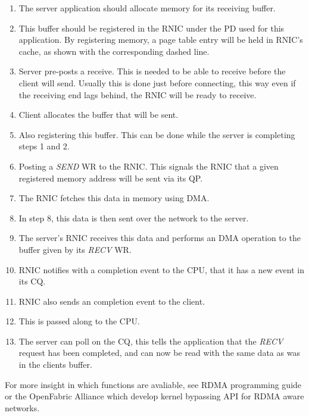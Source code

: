\begin{enumerate}
    \item The server application should allocate memory for its receiving buffer.
    \item This buffer should be registered in the RNIC under the PD used for this application.
    By registering memory, a page table entry will be held in RNIC's cache, as shown with the corresponding dashed line.
    \item Server pre-posts a receive.
    This is needed to be able to receive before the client will send.
    Usually this is done just before connecting, this way even if the receiving end lags behind, the RNIC will be ready to receive.
    \item Client allocates the buffer that will be sent.
    \item Also registering this buffer.
    This can be done while the server is completing steps 1 and 2.
    \item Posting a \textit{SEND} WR to the RNIC.
    This signals the RNIC that a given registered memory address will be sent via its QP.
    \item The RNIC fetches this data in memory using DMA.
    \item In step 8, this data is then sent over the network to the server.
    \item The server's RNIC receives this data and performs an DMA operation to the buffer given by its \textit{RECV} WR.
    \item RNIC notifies with a completion event to the CPU, that it has a new event in its CQ.
    \item RNIC also sends an completion event to the client.
    \item This is passed along to the CPU.
    \item The server can poll on the CQ, this tells the application that the \textit{RECV} request has been completed, and can now be read with the same data as was in the clients buffer.
\end{enumerate}

For more insight in which functions are avaliable, see RDMA programming guide\cite{mellanox_prog_guide} or the OpenFabric Alliance\cite{openfab} which develop kernel bypassing API for RDMA aware networks.
